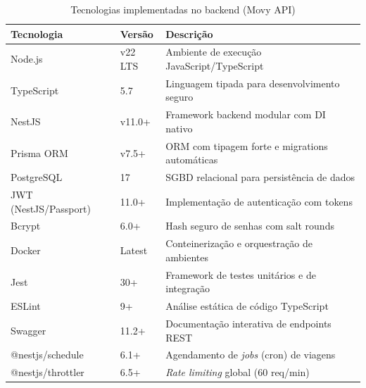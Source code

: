 \begin{table}[H]
\centering
\caption{Tecnologias implementadas no backend (Movy API)}
\label{tab:tecnologias_implementadas}
\begin{tabularx}{\textwidth}{l l X}
\toprule
\textbf{Tecnologia} & \textbf{Versão} & \textbf{Descrição} \\
\midrule
Node.js & v22 LTS & Ambiente de execução JavaScript/TypeScript \\
TypeScript & 5.7 & Linguagem tipada para desenvolvimento seguro \\
NestJS & v11.0+ & Framework backend modular com DI nativo \\
Prisma ORM & v7.5+ & ORM com tipagem forte e migrations automáticas \\
PostgreSQL & 17 & SGBD relacional para persistência de dados \\
JWT (NestJS/Passport) & 11.0+ & Implementação de autenticação com tokens \\
Bcrypt & 6.0+ & Hash seguro de senhas com salt rounds \\
Docker & Latest & Conteinerização e orquestração de ambientes \\
Jest & 30+ & Framework de testes unitários e de integração \\
ESLint & 9+ & Análise estática de código TypeScript \\
Swagger & 11.2+ & Documentação interativa de endpoints REST \\
@nestjs/schedule & 6.1+ & Agendamento de \textit{jobs} (cron) de viagens \\
@nestjs/throttler & 6.5+ & \textit{Rate limiting} global (60 req/min) \\
\bottomrule
\end{tabularx}
\end{table}
